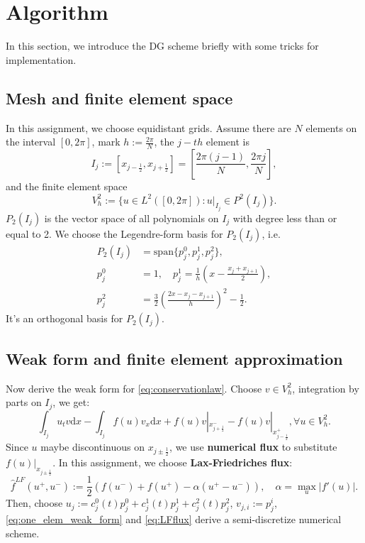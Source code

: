 \documentclass[a4paper]{article}
\newcommand{\dif}{\mathrm{d}}
\begin{document}
\section{Algorithm}
In this section, we introduce the DG scheme briefly with some tricks for implementation.

\subsection{Mesh and finite element space}
In this assignment, we choose equidistant grids. Assume there are $N$ elements on the 
interval $[0,2\pi]$, mark $h:=\frac{2\pi}{N}$, the $j-th$ element is 
\begin{displaymath}
    I_{j}:=[x_{j-\frac{1}{2}},x_{j+\frac{1}{2}}]
    =\left[\frac{2\pi(j-1)}{N},\frac{2\pi j}{N}\right],
\end{displaymath}
and the finite element space 
\begin{displaymath}
    V_{h}^{2}:=\{u\in L^{2}([0,2\pi]):u|_{I_j}\in P^{2}(I_j)\}.
\end{displaymath}
$P_{2}(I_{j})$ is the vector space of all polynomials on 
$I_{j}$ with degree less than or equal to 2. 
We choose the Legendre-form basis for $P_{2}(I_{j})$, i.e. 
\begin{equation}
    \label{eq:basis}
    \begin{aligned}
        P_{2}(I_j)&=\text{span}\{p_{j}^{0},p_{j}^{1},p_{j}^2\},\\
        p_{j}^{0}&=1,\quad p_{j}^{1}=\frac{1}{h}\left(x-\frac{x_{j}+x_{j+1}}{2}\right),\\
        p_{j}^{2}&=\frac{3}{2}\left(\frac{2x-x_{j}-x_{j+1}}{h}\right)^2-\frac{1}{2}.
    \end{aligned}
\end{equation}
It's an orthogonal basis for $P_{2}(I_j)$.
\subsection{Weak form and finite element approximation}
Now derive the weak form for \eqref{eq:conservationlaw}. Choose $v\in V_{h}^{2}$, 
integration by parts on $I_{j}$, we get:
\begin{equation}
    \label{eq:one_elem_weak_form}
    \int_{I_j}u_t v\dif x-\int_{I_j}f(u)v_x\dif x+f(u)v|_{x_{j+\frac{1}{2}}^{-}}
    -f(u)v|_{x_{j-\frac{1}{2}}^{+}}, \forall u\in V_{h}^{2}.
\end{equation}
Since $u$ maybe discontinuous on $x_{j\pm\frac{1}{2}}$, we use 
\textbf{numerical flux} to substitute $f(u)|_{x_{j\pm\frac{1}{2}}}$. 
In this assignment, we choose \textbf{Lax-Friedriches flux}:
\begin{equation}
    \label{eq:LFflux}
    \hat{f}^{LF}(u^{+},u^{-}):=\frac{1}{2}
    \left(f(u^-)+f(u^+)-\alpha(u^{+}-u^{-})\right),
    \quad \alpha=\max_{u}|f'(u)|.
\end{equation}
Then, choose $u_{j}:=c_{j}^{0}(t)p_{j}^{0}+c_{j}^{1}(t)p_{j}^{1}+c_{j}^{2}(t)p_{j}^{2}$, 
$v_{j,i}:=p_{j}^{i}$, \eqref{eq:one_elem_weak_form} and \eqref{eq:LFflux} 
derive a semi-discretize numerical scheme.
\end{document}
